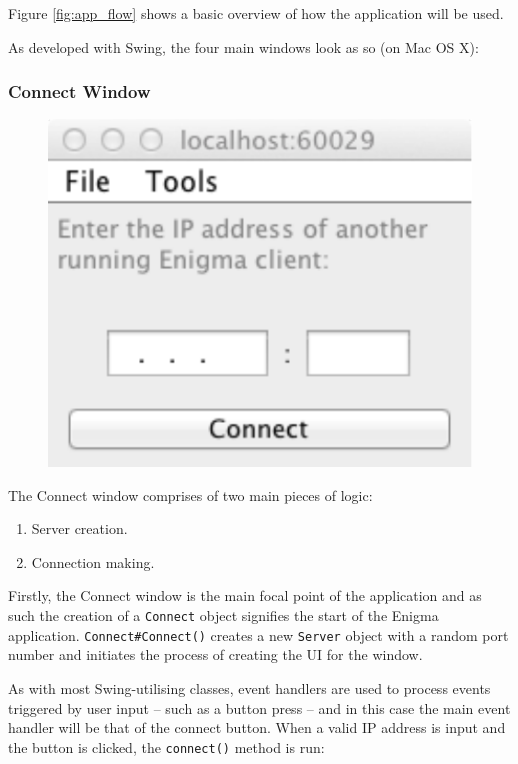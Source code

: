     Figure \ref{fig:app_flow} shows a basic overview of how the application will be used.
    
    As developed with Swing, the four main windows look as so (on Mac OS X):
    
    \subsubsection{Connect Window}
    
    \begin{figure}
      \centering
      \includegraphics[scale=0.7]{./Figures/Ch6/6-3-1-2-connect_window.pdf}
      \label{fig:connect_window}
    \end{figure}
    
    The Connect window comprises of two main pieces of logic:
    
    \begin{enumerate}
      \item Server creation.
      \item Connection making.
    \end{enumerate}
    
    Firstly, the Connect window is the main focal point of the application and as such the creation of a \verb!Connect! object signifies the start of the Enigma application. \verb!Connect#Connect()! creates a new \verb!Server! object with a random port number and initiates the process of creating the UI for the window.
    
    As with most Swing-utilising classes, event handlers are used to process events triggered by user input -- such as a button press -- and in this case the main event handler will be that of the connect button. When a valid IP address is input and the button is clicked, the \verb!connect()! method is run: \\
    
